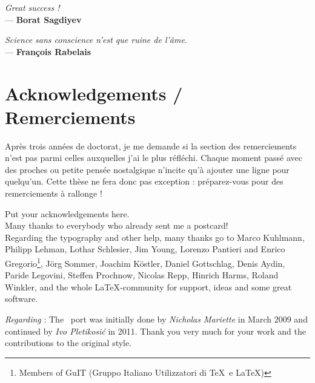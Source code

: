 

\begin{flushleft}{\slshape    
Great success !} \\ \medskip
--- \textbf{Borat Sagdiyev}
\end{flushleft}
\begin{flushright}{\slshape    
Science sans conscience n'est que ruine de l'âme.} \\ \medskip
--- \textbf{Fran\c{c}ois Rabelais}
\end{flushright}

\npar




\bigskip


\begingroup

\let\clearpage\relax
\let\cleardoublepage\relax
\let\cleardoublepage\relax

\chapter*{Acknowledgements / Remerciements}

Après trois années de doctorat, je me demande si la section des remerciements n'est pas parmi celles auxquelles j'ai le plus réfléchi. Chaque moment passé avec des proches ou petite pensée nostalgique n'incite qu'à ajouter une ligne pour quelqu'un. Cette thèse ne fera donc pas exception : préparez-vous pour des remerciements à rallonge ! 

\noindent Put your acknowledgements here.\\

\noindent Many thanks to everybody who already sent me a postcard!\\

\noindent Regarding the typography and other help, many thanks go to Marco Kuhlmann, Philipp Lehman, Lothar Schlesier, Jim Young, Lorenzo Pantieri and Enrico Gregorio\footnote{Members of GuIT (Gruppo Italiano Utilizzatori di \TeX\ e \LaTeX )}, J\"org Sommer, Joachim K\"ostler, Daniel Gottschlag, Denis Aydin, Paride Legovini, Steffen Prochnow, Nicolas Repp, Hinrich Harms, Roland Winkler, and the whole \LaTeX-community for support, ideas and some great software.

\bigskip

\noindent\emph{Regarding \mLyX}: The \mLyX\ port was initially done by
\emph{Nicholas Mariette} in March 2009 and continued by
\emph{Ivo Pletikosi\'c} in 2011. Thank you very much for your work and the contributions to the original style.

\endgroup